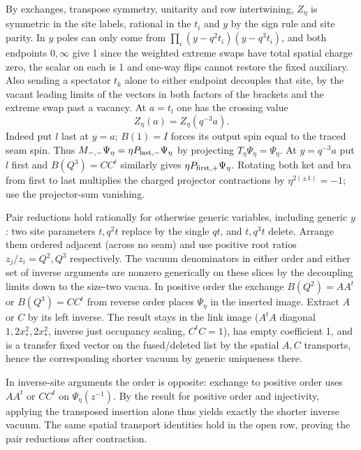 By exchanges, transpose symmetry, unitarity and row intertwining, \(Z_\eta\) is symmetric in the site labels, rational in the \(t_i\) and \(y\) by the sign rule and site parity. In \(y\) poles can only come from \(\prod_i(y-q^2t_i)(y-q^3t_i)\), and both endpoints \(0,\infty\) give 1 since the weighted extreme swaps have total spatial charge zero, the scalar on each is 1 and one-way flips cannot restore the fixed auxiliary. Also sending a spectator \(t_k\) alone to either endpoint decouples that site, by the vacant leading limits of the vectors in both factors of the brackets and the extreme swap past a vacancy. At \(a=t_l\) one has the crossing value
\[
                         Z_\eta(a)=Z_\eta(q^{-3}a).
\]
Indeed put \(l\) last at \(y=a\); \(B(1)=I\) forces its output spin equal to the traced seam spin. Thus \(M_{-,-}\Psi_\eta=\eta P_{\rm last,-}\Psi_\eta\) by projecting \(T_\eta\Psi_\eta=\Psi_\eta\). At \(y=q^{-3}a\) put \(l\) first and \(B(Q^3)=CC^t\) similarly gives \(\eta P_{\rm first,+}\Psi_\eta\). Rotating both ket and bra from first to last multiplies the charged projector contractions by \(\eta^{2(\pm1)}=-1\); use the projector-sum vanishing.

Pair reductions hold rationally for otherwise generic variables, including generic \(y\): two site parameters \(t,q^2t\) replace by the single \(qt\), and \(t,q^3t\) delete. Arrange them ordered adjacent (across no seam) and use positive root ratios \(z_j/z_i=Q^2,Q^3\) respectively. The vacuum denominators in either order and either set of inverse arguments are nonzero generically on these slices by the decoupling limits down to the size-two vacua. In positive order the exchange \(B(Q^2)=A A^t\) or \(B(Q^3)=C C^t\) from reverse order places \(\Psi_\eta\) in the inserted image. Extract \(A\) or \(C\) by its left inverse. The result stays in the link image (\(A^t A\) diagonal \(1,2x_*^2,2x_*^2\), inverse just occupancy scaling, \(C^t C=1\)), has empty coefficient 1, and is a transfer fixed vector on the fused/deleted list by the spatial \(A,C\) transports, hence the corresponding shorter vacuum by generic uniqueness there.

In inverse-site arguments the order is opposite: exchange to positive order uses \(A A^t\) or \(C C^t\) on \(\Psi_\eta(z^{-1})\). By the result for positive order and injectivity, applying the transposed insertion alone thus yields exactly the shorter inverse vacuum. The same spatial transport identities hold in the open row, proving the pair reductions after contraction.


